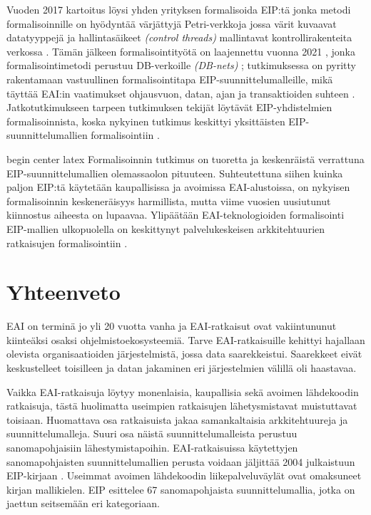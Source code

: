 Vuoden 2017 kartoitus \citep{Ritter2017} löysi yhden yrityksen formalisoida EIP:tä \citep{Fahland2013} jonka metodi formalisoinnille on hyödyntää värjättyjä Petri-verkkoja jossa värit kuvaavat datatyyppejä ja hallintasäikeet \textit{(control threads)} mallintavat kontrollirakenteita verkossa \citep{Fahland2013}.
Tämän jälkeen formalisointityötä on laajennettu vuonna 2021 \citep{Ritter2021}, jonka formalisointimetodi perustuu DB-verkoille \textit{(DB-nets)} \citep{Montali2017}; tutkimuksessa on pyritty rakentamaan vastuullinen formalisointitapa EIP-suunnittelumalleille, mikä täyttää EAI:in vaatimukset ohjausvuon, datan, ajan ja transaktioiden suhteen \citep{Ritter2021}. Jatkotutkimukseen tarpeen tutkimuksen tekijät löytävät EIP-yhdistelmien formalisoinnista, koska nykyinen tutkimus keskittyi yksittäisten EIP-suunnittelumallien formalisointiin \citep{Ritter2021}.

begin center latex
Formalisoinnin tutkimus on tuoretta ja keskenräistä verrattuna EIP-suunnittelumallien olemassaolon pituuteen. Suhteutettuna siihen kuinka paljon EIP:tä käytetään kaupallisissa ja avoimissa EAI-alustoissa, on nykyisen formalisoinnin keskeneräisyys harmillista, mutta viime vuosien uusiutunut kiinnostus aiheesta on lupaavaa. Ylipäätään EAI-teknologioiden formalisointi EIP-mallien ulkopuolella on keskittynyt palvelukeskeisen arkkitehtuurien ratkaisujen formalisointiin \citep{Ritter2017}.





\chapter{Yhteenveto}

EAI on terminä jo yli 20 vuotta vanha ja EAI-ratkaisut ovat vakiintununut kiinteäksi osaksi ohjelmistoekosysteemiä. Tarve EAI-ratkaisuille kehittyi hajallaan olevista organisaatioiden järjestelmistä, jossa data saarekkeistui. Saarekkeet eivät keskustelleet toisilleen ja datan jakaminen eri järjestelmien välillä oli haastavaa.

Vaikka EAI-ratkaisuja löytyy monenlaisia, kaupallisia sekä avoimen lähdekoodin ratkaisuja, tästä huolimatta useimpien ratkaisujen lähetysmistavat muistuttavat toisiaan.
Huomattava osa ratkaisuista jakaa samankaltaisia arkkitehtuureja ja suunnittelumalleja. Suuri osa näistä suunnittelumalleista perustuu sanomapohjaisiin lähestymistapoihin.
EAI-ratkaisuissa käytettyjen sanomapohjaisten suunnittelumallien perusta voidaan jäljittää 2004 julkaistuun EIP-kirjaan \citep{Hohpe2004}. Useimmat avoimen lähdekoodin liikepalveluväylät ovat omaksuneet kirjan mallikielen. EIP esittelee 67 sanomapohjaista suunnittelumallia, jotka on jaettun seitsemään eri kategoriaan.


